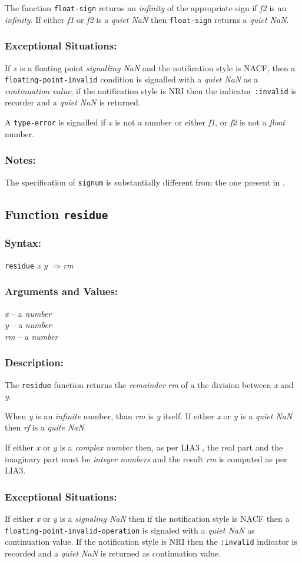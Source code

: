 \documentclass[10pt,fleqn]{article}
\newcommand{\code}[1]{\texttt{#1}}
\newcommand{\clliaterm}[1]{\textit{#1}}
\newcommand{\varname}[1]{\textit{#1}}
\newcommand{\clterm}[1]{\textit{#1}}
\newcommand{\RArrow}{$\Rightarrow$}
\newcommand{\DDictionaryItem}[1]{\vspace*{6pt}\noindent\hrulefill\vspace*{-9pt}\subsection*{#1}}
\newcommand{\DSyntax}{\subsubsection*{Syntax:}}
\newcommand{\DArgsNValues}{\subsubsection*{Arguments and Values:}}
\newcommand{\DDescription}{\subsubsection*{Description:}}
\newcommand{\DExceptional}{\subsubsection*{Exceptional Situations:}}
\newcommand{\DNotes}{\subsubsection*{Notes:}}
\begin{document}
The function \code{float-sign} returns an \clliaterm{infinity} of the
appropriate sign if \varname{f2} is an \clliaterm{infinity}.  If
either \varname{f1} or \varname{f2} is a \clliaterm{quiet NaN} then
\code{float-sign} returns a \clliaterm{quiet NaN}.

\DExceptional{}

If \varname{x} is a floating point \clliaterm{signalling NaN} and the
notification style is NACF, then a\\
\code{floating-point-invalid} condition is signalled with a
\clliaterm{quiet NaN} as a \emph{continuation value}; if the
notification style is NRI then the indicator \code{:invalid} is
recorder and a \clliaterm{quiet NaN} is returned.

A \code{type-error} is signalled if \varname{x} is not a number or
either \varname{f1}, or \varname{f2} is not a \clterm{float} number.


\DNotes{}

The specification of \code{signum} is substantially different from the
one present in \cite{1994:ANSICL}.


\DDictionaryItem{Function \code{residue}}
\index{R!\code{residue}}

\DSyntax{}

\code{residue} \varname{x} \varname {y} \RArrow \varname{rm}

\DArgsNValues{}

\varname{x} -- a \clterm{number}\\
\varname{y} -- a \clterm{number}\\
\varname{rm} -- a \clterm{number}


\DDescription{}

The \code{residue} function returns the \clliaterm{remainder}
\varname{rm} of a the division between \varname{x} and \varname{y}.

When \varname{y} is an \clliaterm{infinite} number, than \varname{rm}
is \varname{y} itself.  If either \varname{x} or \varname{y} is a
\clliaterm{quiet NaN} then \varname{rf} is a \clliaterm{quite NaN}.

If either \varname{x} or \varname{y} is a \clterm{complex number}
then, as per LIA3 \cite{2004:LIA3}, the real part and the imaginary
part must be \clterm{integer numbers} and the result \varname{rm} is
computed as per LIA3.


\DExceptional{}

If either \varname{x} or \varname{y} is a \clliaterm{signaling NaN}
then if the notification style is NACF then a\\
\code{floating-point-invalid-operation} is signaled with a
\clliaterm{quiet NaN} as continuation value.  If the notification
style is NRI then the \code{:invalid} indicator is recorded and a
\clliaterm{quiet NaN} is returned as continuation value.
\end{document}
